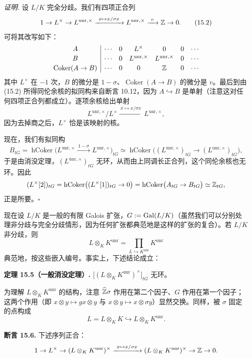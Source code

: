 \textit{证明.} 设 $L/K$ 完全分歧。我们有四项正合列
\begin{equation}
1\to L^{\times}\to L^{\mathrm{unr},\times}\xrightarrow{\ x\mapsto x/\sigma x\ }L^{\mathrm{unr},\times}\xrightarrow{\ v\ }\Z\to 0. \tag{15.2}
\end{equation}
可将其改写如下：
\[
\begin{array}{c|cccccc}
A & \cdots & 0 & L^{\times} & 0 & 0 & \cdots\\[2pt]
B & \cdots & 0 & L^{\mathrm{unr},\times} & L^{\mathrm{unr},\times} & 0 & \cdots\\[2pt]
\operatorname{Coker}(A\to B) & \cdots & 0 & 0 & \mathbb{Z} & 0 & \cdots
\end{array}
\]
其中 $L^{\times}$ 在 $-1$ 次，$B$ 的微分是 $1-\sigma$、$\operatorname{Coker}(A\to B)$ 的微分是 $v$。最后到由 (15.2) 所得同伦余核的拟同构来自断言 10.12，因为 $A\hookrightarrow B$ 是单射（注意这对任何四项正合列都成立）。逐项余核给出单射
\[
L^{\mathrm{unr},\times}/L^{\times}\xrightarrow{\ x\mapsto x/\sigma x\ }L^{\mathrm{unr},\times},
\]
因为去掉商之后，$L^{\times}$ 恰是该映射的核。

现在，我们有拟同构
\[
B_{tG}=\operatorname{hCoker}\bigl(L^{\mathrm{unr},\times}\xrightarrow{\ 1-\sigma\ }L^{\mathrm{unr},\times}\bigr)_{tG}\simeq\operatorname{hCoker}\bigl((L^{\mathrm{unr},\times})_{tG}\to(L^{\mathrm{unr},\times})_{tG}\bigr),
\]
于是由消没定理，$(L^{\mathrm{unr},\times})_{tG}$ 无环，从而由上同调长正合列，这个同伦余核也无环。因此
\[
(L^{\times}[2])_{tG}=\operatorname{hCoker}\bigl((L^{\times}[1])_{tG}\to 0\bigr)=\operatorname{hCoker}\bigl(A_{tG}\to B_{tG}\bigr)\simeq\mathbb{Z}_{tG},
\]
正是所要。\hfill$\square$

现在设 $L/K$ 是一般的有限 Galois 扩张，$G:=\operatorname{Gal}(L/K)$（虽然我们可以分别处理非分歧与完全分歧情形，因为任何扩张都典范地是这样的扩张的复合）。若 $L/K$ 非分歧，则
\[
L\otimes_{K}K^{\mathrm{unr}}=\prod_{L\hookrightarrow K^{\mathrm{unr}}}K^{\mathrm{unr}}
\]
典范地，按这些嵌入编号。事实上，下述结论成立：

\textbf{定理 15.5（一般消没定理）.} $\bigl[(L\otimes_{K}K^{\mathrm{unr}})^{\times}\bigr]_{tG}$ 无环。

为理解 $L\otimes_{K}K^{\mathrm{unr}}$ 的结构，注意 $\widehat{\mathbb{Z}}\sigma$ 作用在第二个因子、$G$ 作用在第一个因子；这两个作用（即 $x\otimes y\mapsto gx\otimes y$ 与 $x\otimes y\mapsto x\otimes\sigma y$）显然交换。同样，被 $\sigma$ 固定的点构成
\[
L=L\otimes_{K}K\hookrightarrow L\otimes_{K}K^{\mathrm{unr}}.
\]

\textbf{断言 15.6.} 下述序列正合：
\[
1\to L^{\times}\to(L\otimes_{K}K^{\mathrm{unr}})^{\times}\xrightarrow{\ x\mapsto x/\sigma x\ }(L\otimes_{K}K^{\mathrm{unr}})^{\times}\to\Z\to 0.
\]

